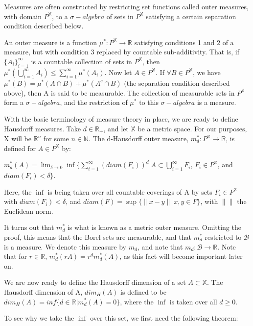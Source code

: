Measures are often constructed by restricting set functions called outer
measures, with domain $P^\mathbb{X}$, to a $\sigma-algebra$ of sets in
$P^\mathbb{X}$ satisfying a certain separation condition described below.

An outer measure is a function $\mu^*:P^\mathbb{X}\rightarrow\mathbb{R}$
satisfying conditions 1 and 2 of a measure, but with condition 3 replaced by
countable sub-additivity. That is, if $\{A_i\}^\infty_{i=1}$ is a countable
collection of sets in $P^\mathbb{X}$, then
$\mu^*(\bigcup\limits_{i=1}^{\infty}A_i)\leq\sum\limits_{i=1}^{\infty}\mu^*(A_i)$.
Now let $A \in P^\mathbb{X}$. If $\forall B \in P^\mathbb{X}$, we have
$\mu^*(B)=\mu^*(A \cap B)+\mu^*(A^c \cap B)$ (the separation condition
described above), then A is said to be measurable. The collection of
measurable sets in $P^\mathbb{X}$ form a $\sigma-algebra$, and the
restriction of $\mu^*$ to this $\sigma-algebra$ is a measure.

With the basic terminology of measure theory in place, we are ready to define
Hausdorff measures. Take $d \in \mathbb{R_+}$, and let $\mathbb{X}$ be a
metric space. For our purposes, X will be $\mathbb{R}^n$ for some $n \in
\mathbb{N}$. The d-Hausdorff outer measure, $m_d^*:P^\mathbb{X} \rightarrow
\mathbb{R}$, is defined for $A \in P^\mathbb{X}$ by: 

$m_d^*(A)=\lim_{\delta \to 0} \inf \{\sum\limits_{i=1}^{\infty}(diam(F_i))^d|A
\subset \bigcup\limits_{i=1}^{\infty}F_i$, $F_i \in P^\mathbb{X}$, and
$diam(F_i)<\delta\}$. 

Here, the $\inf$ is being taken over all countable coverings of A by sets $F_i
\in P^\mathbb{X}$ with $diam(F_i)<\delta$, and $diam(F)=\sup\{\|x-y\||x,y \in
F\}$, with $\| \|$ the Euclidean norm.

It turns out that $m_d^*$ is what is known as a metric outer measure.
Omitting the proof, this means that the Borel sets are measurable, and that
$m_d^*$ restricted to $\mathcal{B}$ is a measure. We denote this measure by
$m_d$, and note that $m_d:\mathcal{B} \rightarrow \mathbb{R}$. Note that for
$r \in \mathbb{R}$, $m_d^*(rA)=r^dm_d^*(A)$, as this fact will become
important later on.   

We are now ready to define the Hausdorff dimension of a set $A \subset
\mathbb{X}$. The Hausdorff dimension of A, $dim_H(A)$ is defined to be
$dim_H(A)=inf\{d \in \mathbb{R}| m_d^*(A)=0\}$, where the $\inf$ is taken
over all $d\geq 0$.

To see why we take the $\inf$ over this set, we first need the following theorem:

